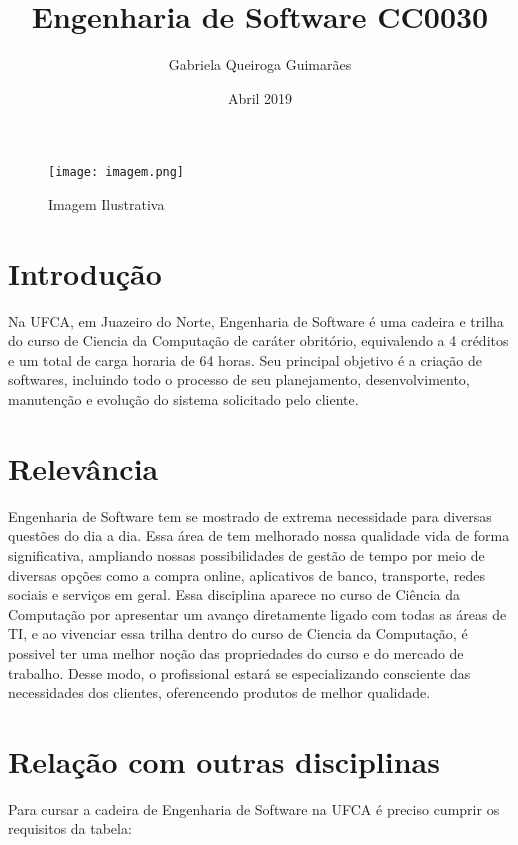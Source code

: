 \documentclass[10pt]{article}
\title{Engenharia de Software CC0030}
\author{ Gabriela Queiroga Guimarães }
\date{Abril 2019}
\begin{document}
\maketitle

\begin{figure}[!htb]
    \centering
    \texttt{[image: imagem.png]}
    \caption{Imagem Ilustrativa}
    \label{fig1}
  \end{figure}
  
\section{Introdução}

Na UFCA, em Juazeiro do Norte, Engenharia de Software é uma cadeira e trilha do curso de Ciencia da Computação de caráter obritório, equivalendo a 4 créditos e um total de carga horaria de 64 horas. \cite{a}
Seu principal objetivo é a criação de softwares, incluindo todo o processo de seu planejamento, desenvolvimento, manutenção e evolução do sistema solicitado pelo cliente.
  
\section{Relevância}

 Engenharia de Software tem se mostrado de extrema necessidade para diversas questões do dia a dia. Essa área de tem melhorado nossa qualidade vida de forma significativa, ampliando nossas possibilidades de gestão de tempo por meio de diversas opções como a compra online, aplicativos de banco, transporte, redes sociais e serviços em geral. 
 Essa disciplina aparece no curso de Ciência da Computação por apresentar um avanço diretamente ligado com todas as áreas de TI, e ao vivenciar essa trilha dentro do curso de Ciencia da Computação, é possivel ter uma melhor noção das propriedades do curso e do mercado de trabalho. Desse modo, o profissional estará se especializando consciente das necessidades dos clientes, oferencendo produtos de
 melhor qualidade.
 
 \section{Relação com outras disciplinas}
 
 Para cursar a cadeira de Engenharia de Software na UFCA é
 preciso cumprir os requisitos da tabela:
 
 \vspace*{7mm}
 
\end{document}
